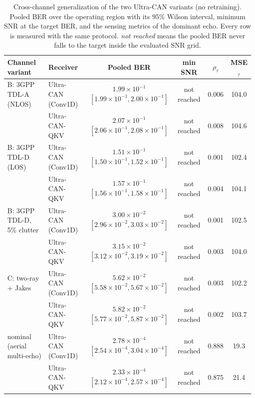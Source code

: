 \begin{table}[t]
\centering
\caption{Cross-channel generalization of the two Ultra-CAN variants (no retraining). Pooled BER over the operating region with its $95\%$ Wilson interval, minimum SNR at the target BER, and the sensing metrics of the dominant echo. Every row is measured with the same protocol. \emph{not reached} means the pooled BER never falls to the target inside the evaluated SNR grid.}
\label{tab:generalization}
\begin{tabular}{llcccc}
\toprule
Channel variant & Receiver & Pooled BER & min SNR & $\rho_\tau$ & MSE$_\tau$ \\
\midrule
B: 3GPP TDL-A (NLOS) & Ultra-CAN (Conv1D) & $1.99\times 10^{-1}$ $[1.99\times 10^{-1}, 2.00\times 10^{-1}]$ & not reached & 0.006 & 104.0 \\
 & Ultra-CAN-QKV & $2.07\times 10^{-1}$ $[2.06\times 10^{-1}, 2.08\times 10^{-1}]$ & not reached & 0.008 & 104.6 \\
\midrule
B: 3GPP TDL-D (LOS) & Ultra-CAN (Conv1D) & $1.51\times 10^{-1}$ $[1.50\times 10^{-1}, 1.52\times 10^{-1}]$ & not reached & 0.001 & 102.4 \\
 & Ultra-CAN-QKV & $1.57\times 10^{-1}$ $[1.56\times 10^{-1}, 1.58\times 10^{-1}]$ & not reached & 0.004 & 104.1 \\
\midrule
B: 3GPP TDL-D, 5\% clutter & Ultra-CAN (Conv1D) & $3.00\times 10^{-2}$ $[2.96\times 10^{-2}, 3.03\times 10^{-2}]$ & not reached & 0.001 & 102.5 \\
 & Ultra-CAN-QKV & $3.15\times 10^{-2}$ $[3.12\times 10^{-2}, 3.19\times 10^{-2}]$ & not reached & 0.003 & 104.0 \\
\midrule
C: two-ray + Jakes & Ultra-CAN (Conv1D) & $5.62\times 10^{-2}$ $[5.58\times 10^{-2}, 5.67\times 10^{-2}]$ & not reached & 0.003 & 102.2 \\
 & Ultra-CAN-QKV & $5.82\times 10^{-2}$ $[5.77\times 10^{-2}, 5.87\times 10^{-2}]$ & not reached & 0.002 & 103.7 \\
\midrule
nominal (aerial multi-echo) & Ultra-CAN (Conv1D) & $2.78\times 10^{-4}$ $[2.54\times 10^{-4}, 3.04\times 10^{-4}]$ & not reached & 0.888 & 19.3 \\
 & Ultra-CAN-QKV & $2.33\times 10^{-4}$ $[2.12\times 10^{-4}, 2.57\times 10^{-4}]$ & not reached & 0.875 & 21.4 \\
\bottomrule
\end{tabular}
\end{table}
